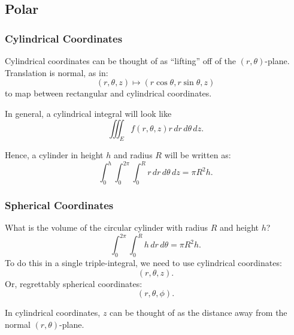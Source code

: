 \documentclass{article}
\begin{document}
\subsection{Polar}

\subsubsection{Cylindrical Coordinates}

Cylindrical coordinates can be thought of as ``lifting'' off of the $(r,\theta)$-plane. Translation is normal, as in:
\[ (r, \theta, z) \mapsto (r \cos \theta, r \sin \theta, z) \]
to map between rectangular and cylindrical coordinates.

In general, a cylindrical integral will look like
\[ \iiint_{E} f(r, \theta, z)r \, dr\, d\theta\, dz. \]

Hence, a cylinder in height $h$ and radius $R$ will be written as:
\[
  \int_{0}^{h}\int_{0}^{2\pi}\int_{0}^{R} r \, dr \, d\theta \, dz = \pi R^{2}h.
\]

\subsubsection{Spherical Coordinates}

\begin{ex}
  What is the volume of the circular cylinder with radius $R$ and height $h$?
  \[ \int_{0}^{2\pi}\int_{0}^{R} h\,dr\,d\theta = \pi R^{2}h. \]
  To do this in a single triple-integral, we need to use cylindrical coordinates:
  \[ (r, \theta, z). \]
  Or, regrettably spherical coordinates:
  \[ (r, \theta, \phi). \]

  In cylindrical coordinates, $z$ can be thought of as the distance away from the normal $(r, \theta)$\nobreakdash-plane.
\end{ex}
\end{document}
